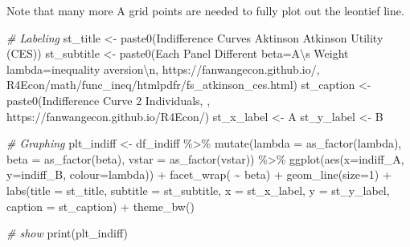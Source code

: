 \documentclass[
]{book}
\newenvironment{Shaded}{\begin{snugshade}}{\end{snugshade}}
\newcommand{\AttributeTok}[1]{\textcolor[rgb]{0.77,0.63,0.00}{#1}}
\newcommand{\CommentTok}[1]{\textcolor[rgb]{0.56,0.35,0.01}{\textit{#1}}}
\newcommand{\DecValTok}[1]{\textcolor[rgb]{0.00,0.00,0.81}{#1}}
\newcommand{\FunctionTok}[1]{\textcolor[rgb]{0.00,0.00,0.00}{#1}}
\newcommand{\NormalTok}[1]{#1}
\newcommand{\OtherTok}[1]{\textcolor[rgb]{0.56,0.35,0.01}{#1}}
\newcommand{\SpecialCharTok}[1]{\textcolor[rgb]{0.00,0.00,0.00}{#1}}
\newcommand{\StringTok}[1]{\textcolor[rgb]{0.31,0.60,0.02}{#1}}
\begin{document}
Note that many more A grid points are needed to fully plot out the leontief line.

\begin{Shaded}
\begin{Highlighting}[]
\CommentTok{\# Labeling}
\NormalTok{st\_title }\OtherTok{\textless{}{-}} \FunctionTok{paste0}\NormalTok{(}\StringTok{\textquotesingle{}Indifference Curves Aktinson Atkinson Utility (CES)\textquotesingle{}}\NormalTok{)}
\NormalTok{st\_subtitle }\OtherTok{\textless{}{-}} \FunctionTok{paste0}\NormalTok{(}\StringTok{\textquotesingle{}Each Panel Different beta=A}\SpecialCharTok{\textbackslash{}\textquotesingle{}}\StringTok{s Weight lambda=inequality aversion}\SpecialCharTok{\textbackslash{}n}\StringTok{\textquotesingle{}}\NormalTok{,}
                      \StringTok{\textquotesingle{}https://fanwangecon.github.io/\textquotesingle{}}\NormalTok{,}
                      \StringTok{\textquotesingle{}R4Econ/math/func\_ineq/htmlpdfr/fs\_atkinson\_ces.html\textquotesingle{}}\NormalTok{)}
\NormalTok{st\_caption }\OtherTok{\textless{}{-}} \FunctionTok{paste0}\NormalTok{(}\StringTok{\textquotesingle{}Indifference Curve 2 Individuals, \textquotesingle{}}\NormalTok{,}
                     \StringTok{\textquotesingle{}https://fanwangecon.github.io/R4Econ/\textquotesingle{}}\NormalTok{)}
\NormalTok{st\_x\_label }\OtherTok{\textless{}{-}} \StringTok{\textquotesingle{}A\textquotesingle{}}
\NormalTok{st\_y\_label }\OtherTok{\textless{}{-}} \StringTok{\textquotesingle{}B\textquotesingle{}}

\CommentTok{\# Graphing}
\NormalTok{plt\_indiff }\OtherTok{\textless{}{-}}
\NormalTok{  df\_indiff }\SpecialCharTok{\%\textgreater{}\%} \FunctionTok{mutate}\NormalTok{(}\AttributeTok{lambda =} \FunctionTok{as\_factor}\NormalTok{(lambda),}
                       \AttributeTok{beta =} \FunctionTok{as\_factor}\NormalTok{(beta),}
                       \AttributeTok{vstar =} \FunctionTok{as\_factor}\NormalTok{(vstar)) }\SpecialCharTok{\%\textgreater{}\%}
  \FunctionTok{ggplot}\NormalTok{(}\FunctionTok{aes}\NormalTok{(}\AttributeTok{x=}\NormalTok{indiff\_A, }\AttributeTok{y=}\NormalTok{indiff\_B,}
             \AttributeTok{colour=}\NormalTok{lambda)) }\SpecialCharTok{+}
  \FunctionTok{facet\_wrap}\NormalTok{( }\SpecialCharTok{\textasciitilde{}}\NormalTok{ beta) }\SpecialCharTok{+}
  \FunctionTok{geom\_line}\NormalTok{(}\AttributeTok{size=}\DecValTok{1}\NormalTok{) }\SpecialCharTok{+}
  \FunctionTok{labs}\NormalTok{(}\AttributeTok{title =}\NormalTok{ st\_title, }\AttributeTok{subtitle =}\NormalTok{ st\_subtitle,}
       \AttributeTok{x =}\NormalTok{ st\_x\_label, }\AttributeTok{y =}\NormalTok{ st\_y\_label, }\AttributeTok{caption =}\NormalTok{ st\_caption) }\SpecialCharTok{+}
  \FunctionTok{theme\_bw}\NormalTok{()}

\CommentTok{\# show}
\FunctionTok{print}\NormalTok{(plt\_indiff)}
\end{Highlighting}
\end{Shaded}
\end{document}
